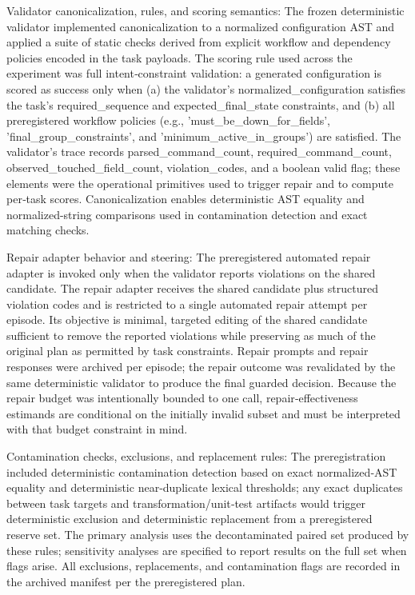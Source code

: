 \documentclass[conference]{IEEEtran}
\begin{document}
Validator canonicalization, rules, and scoring semantics: The frozen deterministic validator implemented canonicalization to a normalized configuration AST and applied a suite of static checks derived from explicit workflow and dependency policies encoded in the task payloads. The scoring rule used across the experiment was full intent‑constraint validation: a generated configuration is scored as success only when (a) the validator's normalized\_configuration satisfies the task's required\_sequence and expected\_final\_state constraints, and (b) all preregistered workflow policies (e.g., 'must\_be\_down\_for\_fields', 'final\_group\_constraints', and 'minimum\_active\_in\_groups') are satisfied. The validator's trace records parsed\_command\_count, required\_command\_count, observed\_touched\_field\_count, violation\_codes, and a boolean valid flag; these elements were the operational primitives used to trigger repair and to compute per‑task scores. Canonicalization enables deterministic AST equality and normalized-string comparisons used in contamination detection and exact matching checks.

Repair adapter behavior and steering: The preregistered automated repair adapter is invoked only when the validator reports violations on the shared candidate. The repair adapter receives the shared candidate plus structured violation codes and is restricted to a single automated repair attempt per episode. Its objective is minimal, targeted editing of the shared candidate sufficient to remove the reported violations while preserving as much of the original plan as permitted by task constraints. Repair prompts and repair responses were archived per episode; the repair outcome was revalidated by the same deterministic validator to produce the final guarded decision. Because the repair budget was intentionally bounded to one call, repair‑effectiveness estimands are conditional on the initially invalid subset and must be interpreted with that budget constraint in mind.

Contamination checks, exclusions, and replacement rules: The preregistration included deterministic contamination detection based on exact normalized‑AST equality and deterministic near‑duplicate lexical thresholds; any exact duplicates between task targets and transformation/unit‑test artifacts would trigger deterministic exclusion and deterministic replacement from a preregistered reserve set. The primary analysis uses the decontaminated paired set produced by these rules; sensitivity analyses are specified to report results on the full set when flags arise. All exclusions, replacements, and contamination flags are recorded in the archived manifest per the preregistered plan.
\end{document}
